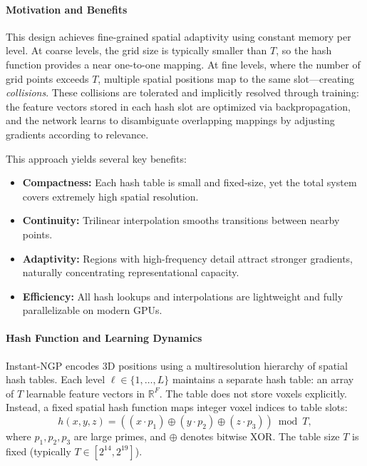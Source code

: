 \begin{enrichment}
\begin{enrichment}
    \paragraph{Motivation and Benefits}
    
    This design achieves fine-grained spatial adaptivity using constant memory per level. At coarse levels, the grid size is typically smaller than \( T \), so the hash function provides a near one-to-one mapping. At fine levels, where the number of grid points exceeds \( T \), multiple spatial positions map to the same slot—creating \emph{collisions}. These collisions are tolerated and implicitly resolved through training: the feature vectors stored in each hash slot are optimized via backpropagation, and the network learns to disambiguate overlapping mappings by adjusting gradients according to relevance.
    
    This approach yields several key benefits:
    \begin{itemize}
        \item \textbf{Compactness:} Each hash table is small and fixed-size, yet the total system covers extremely high spatial resolution.
        \item \textbf{Continuity:} Trilinear interpolation smooths transitions between nearby points.
        \item \textbf{Adaptivity:} Regions with high-frequency detail attract stronger gradients, naturally concentrating representational capacity.
        \item \textbf{Efficiency:} All hash lookups and interpolations are lightweight and fully parallelizable on modern GPUs.
    \end{itemize}
    
    \paragraph{Hash Function and Learning Dynamics}
    
    Instant-NGP encodes 3D positions using a multiresolution hierarchy of spatial hash tables. Each level \( \ell \in \{1, \dots, L\} \) maintains a separate hash table: an array of \( T \) learnable feature vectors in \( \mathbb{R}^F \). The table does not store voxels explicitly. Instead, a fixed spatial hash function maps integer voxel indices to table slots:
    \[
    h(x, y, z) = ((x \cdot p_1) \oplus (y \cdot p_2) \oplus (z \cdot p_3)) \bmod T,
    \]
    where \( p_1, p_2, p_3 \) are large primes, and \( \oplus \) denotes bitwise XOR. The table size \( T \) is fixed (typically \( T \in [2^{14}, 2^{19}] \)).
    

\end{enrichment}
\end{enrichment}
